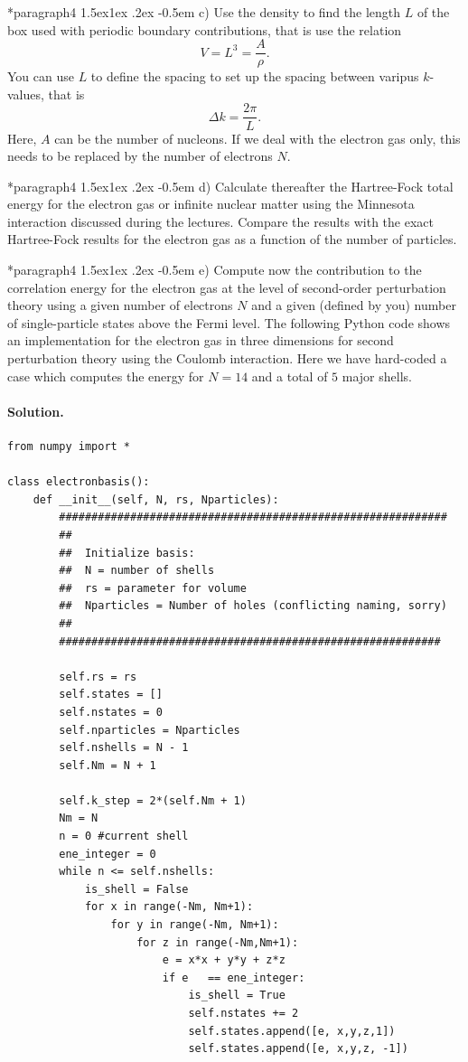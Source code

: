 \documentclass[%
oneside,                 %
final,                   %
10pt]{article}
\makeatletter
\newenvironment{doconceexercise}{}{}
\newcommand\subex{\@startsection*{paragraph}{4}{\z@}%
                  {1.5ex\@plus1ex \@minus.2ex}%
                  {-0.5em}%
                  {\normalfont\normalsize\bfseries}}
\makeatother
\begin{document}
\begin{doconceexercise}
\subex{c)}
Use the density to find the length $L$ of the box used with periodic boundary contributions, that is use the relation
\[
  V= L^3= \frac{A}{\rho}.
\]
You can use $L$ to define the spacing to set up the spacing between varipus $k$-values, that is
\[
  \Delta k = \frac{2\pi}{L}.
\]
Here, $A$ can be the number of nucleons. If we deal with the electron gas only,  this needs to be replaced by  the number of electrons $N$.

\subex{d)}
Calculate thereafter the Hartree-Fock total energy for the electron gas or infinite nuclear matter using the Minnesota interaction discussed during the lectures. Compare the results with the exact Hartree-Fock results  for the electron gas as a function of the number of particles.

\subex{e)}
Compute now the contribution to the correlation energy for the electron gas at the level of second-order perturbation theory using a given number of electrons $N$ and a given (defined by you) number of single-particle states above the Fermi level.
The following Python code shows an implementation for the electron gas in three dimensions for second perturbation theory using the Coulomb interaction. Here we have hard-coded a case which computes the energy for $N=14$ and a total of $5$ major shells.


\paragraph{Solution.}
\begin{verbatim}
from numpy import *

class electronbasis():
    def __init__(self, N, rs, Nparticles):
        ############################################################
        ##
        ##  Initialize basis: 
        ##  N = number of shells
        ##  rs = parameter for volume 
        ##  Nparticles = Number of holes (conflicting naming, sorry)
        ##
        ###########################################################
        
        self.rs = rs
        self.states = []
        self.nstates = 0
        self.nparticles = Nparticles
        self.nshells = N - 1
        self.Nm = N + 1
        
        self.k_step = 2*(self.Nm + 1)
        Nm = N
        n = 0 #current shell
        ene_integer = 0
        while n <= self.nshells:
            is_shell = False
            for x in range(-Nm, Nm+1):
                for y in range(-Nm, Nm+1):
                    for z in range(-Nm,Nm+1):
                        e = x*x + y*y + z*z
                        if e   == ene_integer:
                            is_shell = True
                            self.nstates += 2
                            self.states.append([e, x,y,z,1])
                            self.states.append([e, x,y,z, -1])
                            

\end{verbatim}
\end{doconceexercise}
\end{document}
